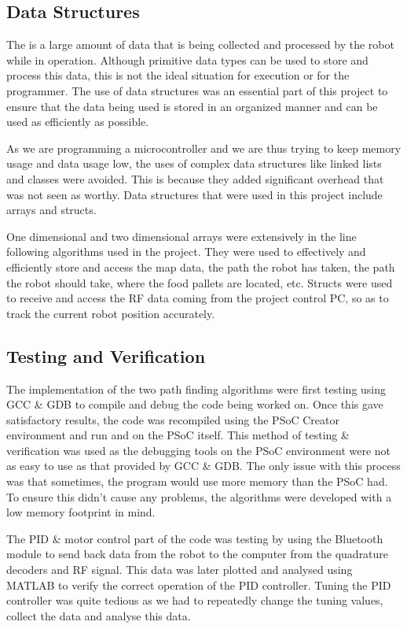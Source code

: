\documentclass{article}
\begin{document}
\subsection{Data Structures}

The is a large amount of data that is being collected and processed by the robot while in operation. Although primitive data types can be used to store and process this data, this is not the ideal situation for execution or for the programmer. The use of data structures was an essential part of this project to ensure that the data being used is stored in an organized manner and can be used as efficiently as possible. 

As we are programming a microcontroller and we are thus trying to keep memory usage and data usage low, the uses of complex data structures like linked lists and classes were avoided. This is because they added significant overhead that was not seen as worthy. Data structures that were used in this project include arrays and structs.

One dimensional and two dimensional arrays were extensively in the line following algorithms used in the project. They were used to effectively and efficiently store and access the map data, the path the robot has taken, the path the robot should take, where the food pallets are located, etc. Structs were used to receive and access the RF data coming from the project control PC, so as to track the current robot position accurately.

\subsection{Testing and Verification}

The implementation of the two path finding algorithms were first testing using GCC \& GDB to compile and debug the code being worked on. Once this gave satisfactory results, the code was recompiled using the PSoC Creator environment and run and on the PSoC itself. This method of testing \& verification was used as the debugging tools on the PSoC environment were not as easy to use as that provided by GCC \& GDB. The only issue with this process was that sometimes, the program would use more memory than the PSoC had. To ensure this didn't cause any problems, the algorithms were developed with a low memory footprint in mind.

The PID \& motor control part of the code was testing by using the Bluetooth module to send back data from the robot to the computer from the quadrature decoders and RF signal. This data was later plotted and analysed using MATLAB to verify the correct operation of the PID controller. Tuning the PID controller was quite tedious as we had to repeatedly change the tuning values, collect the data and analyse this data.
\end{document}
